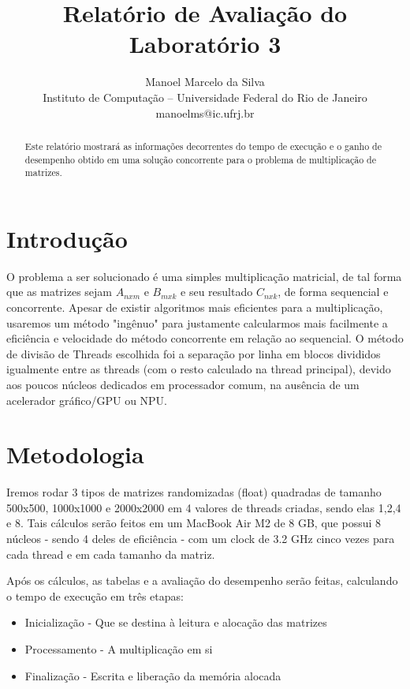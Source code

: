 \documentclass{article}
\title{Relatório de Avaliação do Laboratório 3}
\author{Manoel Marcelo da Silva\\
Instituto de Computação -- Universidade Federal do Rio de Janeiro\\
manoelms@ic.ufrj.br
}
\begin{document}
\maketitle
\begin{abstract}
Este relatório mostrará as informações decorrentes do tempo de execução e o ganho de desempenho obtido em uma solução concorrente para o problema de multiplicação de matrizes. 
 
\end{abstract}

\section{Introdução}
    
O problema a ser solucionado é uma simples multiplicação matricial, de tal forma que as matrizes sejam $A_{nxm}$ e $B_{mxk}$ e seu resultado $C_{nxk}$, de forma sequencial e concorrente. Apesar de existir algoritmos mais eficientes para a multiplicação, usaremos um método "ingênuo" para justamente calcularmos mais facilmente a eficiência e velocidade do método concorrente em relação ao sequencial. O método de divisão de Threads escolhida foi a separação por linha em blocos divididos igualmente entre as threads (com o resto calculado na thread principal), devido aos poucos núcleos dedicados em processador comum, na ausência de um acelerador gráfico/GPU ou NPU.

\section{Metodologia}

Iremos rodar 3 tipos de matrizes randomizadas (float) quadradas de tamanho 500x500, 1000x1000 e 2000x2000 em 4 valores de threads criadas, sendo elas 1,2,4 e 8. Tais cálculos serão feitos em um MacBook Air M2 de 8 GB, que possui 8 núcleos - sendo 4 deles de eficiência - com um clock de 3.2 GHz cinco vezes para cada thread e em cada tamanho da matriz.

Após os cálculos, as tabelas e a avaliação do desempenho serão feitas, calculando o tempo de execução em três etapas: 
\begin{itemize}
    \item Inicialização - Que se destina à leitura e alocação das matrizes
    \item Processamento - A multiplicação em si
    \item Finalização - Escrita e liberação da memória alocada
\end{itemize}
\end{document}
